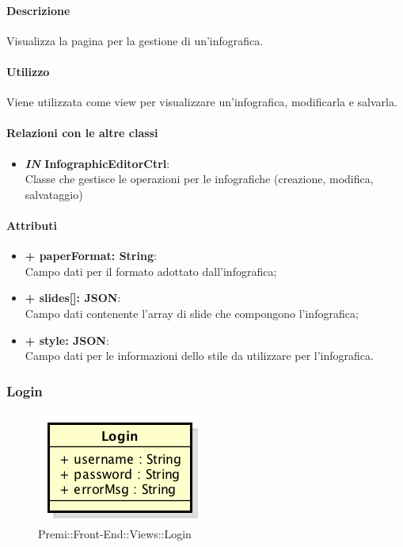 	\paragraph{Descrizione}
	Visualizza la pagina per la gestione di un'infografica.
	
	\paragraph{Utilizzo}
	Viene utilizzata come view per visualizzare un'infografica, modificarla e salvarla.
	
	\paragraph{Relazioni con le altre classi}
	\begin{itemize}
		\item \textbf{\textit{IN} InfographicEditorCtrl}:\\
			Classe che gestisce le operazioni per le infografiche (creazione, modifica, salvataggio)
	\end{itemize}
	
	\paragraph{Attributi}
	\begin{itemize}
		\item \textbf{+ paperFormat: String}:\\
			Campo dati per il formato adottato dall'infografica;
		\item \textbf{+ slides[]: JSON}:\\
			Campo dati contenente l'array di slide che compongono l'infografica;
		\item \textbf{+ style: JSON}:\\
		Campo dati per le informazioni dello stile da utilizzare per l'infografica.
	\end{itemize}
\newpage
	
	
\subsubsection{Login}
	\begin{figure}[h]
		\centering
		\includegraphics[width=0.3\linewidth]{img/premi_front_end_views_login}
		\caption[Premi::Front-End::Views::Login]{Premi::Front-End::Views::Login}
	\end{figure}
	
